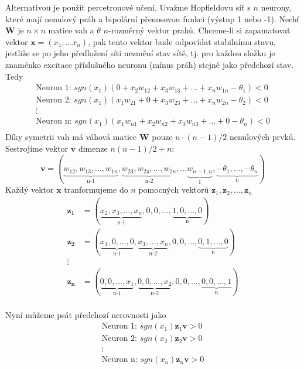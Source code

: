 \documentclass[11pt]{report} %
\renewcommand{\vec}[1]{\mathbf{#1}}
\numberwithin{equation}{section}
\begin{document}
Alternativou je použít percetronové učení. Uvažme Hopfieldovu síť s $n$ neurony, které mají nenulový práh a bipolární přenosovou funkci (výstup 1 nebo -1). Nechť $\vec{W}$ je $n\times n$ matice vah a $\theta$ $n$-rozměrný vektor prahů. Chceme-li si zapamatovat vektor $\vec{x} = (x_1,\dots x_n)$, pak tento vektor bude odpovídat stabilnímu stavu, jestliže se po jeho předložení síti nezmění stav sítě, tj. pro každou složku je znaménko excitace příslušného neuronu (mínus práh) stejné jako předchozí stav. Tedy
\begin{align*}
	\text{Neuron 1: } sgn(x_1)(0 +x_2w_{12}+x_3w_{13} + \dots  + x_nw_{1n} -\theta_1) < 0\\	\text{Neuron 2: } sgn(x_1)(x_1w_{21}  + 0 +x_3w_{23} + \dots  + x_nw_{2n} -\theta_2) < 0\\
	\vdots\\
	\text{Neuron n: } sgn(x_1)(x_1w_{n1} +x_2w_{n2} + x_3w_{n3} + \dots + 0 -\theta_n) < 0\\
\end{align*}
Díky symetrii vah má váhová matice $\vec{W}$ pouze $n\cdot(n-1)/2$ nenulových prvků. Sestrojíme vektor $\vec{v}$ dimenze $n(n-1)/2 + n$:
$$\vec{v} = (
\underbrace{w_{12},w_{13},\dots,w_{1n}}_\text{n-1},
\underbrace{w_{23},w_{24},\dots,w_{2n}}_\text{n-2},
\dots
\underbrace{w_{n-1,n}}_\text{1},
\underbrace{-\theta_1,\dots,-\theta_n}_\text{n}
)$$
Každý vektor $\vec{x}$ tranformujeme do $n$ pomocných vektorů $\vec{z}_1,\vec{z}_2,\dots,\vec{z}_n$
\begin{align*}
\vec{z_1} &= (\underbrace{x_2,x_3,\dots,x_n}_\text{n-1},0,0,\dots, \underbrace{1,0,\dots,0}_\text{n})\\
\vec{z_2} &= (\underbrace{x_1,0,\dots,0}_\text{n-1},
\underbrace{x_3,\dots,x_n}_\text{n-2},
0,0,\dots, \underbrace{0,1,\dots,0}_\text{n})\\
\vdots\\
\vec{z_n} &= (\underbrace{0,0,\dots,x_1}_\text{n-1},
\underbrace{0,0,\dots,x_2}_\text{n-2},
0,0,\dots, \underbrace{0,0,\dots,1}_\text{n})\\
\end{align*}

Nyní můžeme psát předchozí nerovnosti jako
\begin{align*}
\text{Neuron 1: } sgn(x_1)\vec{z}_1 \vec{v} > 0\\	
\text{Neuron 2: } sgn(x_2)\vec{z}_2 \vec{v} > 0\\	
\vdots\\
\text{Neuron n: } sgn(x_n)\vec{z}_n \vec{v} > 0\\	
\end{align*}
\end{document}
